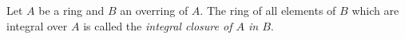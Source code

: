 Let $A$ be a ring and $B$ an overring of $A$. The ring of all elements of $B$ which are integral over $A$ is called the \emph{integral closure of $A$ in $B$}.
